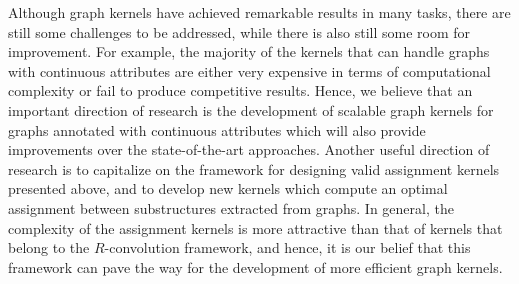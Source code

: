 \documentclass[twoside,11pt]{article}
\begin{document}
Although graph kernels have achieved remarkable results in many tasks, there are still some challenges to be addressed, while there is also still some room for improvement.
For example, the majority of the kernels that can handle graphs with continuous attributes are either very expensive in terms of computational complexity or fail to produce competitive results.
Hence, we believe that an important direction of research is the development of scalable graph kernels for graphs annotated with continuous attributes which will also provide improvements over the state-of-the-art approaches.
Another useful direction of research is to capitalize on the framework for designing valid assignment kernels presented above, and to develop new kernels which compute an optimal assignment between substructures extracted from graphs.
In general, the complexity of the assignment kernels is more attractive than that of kernels that belong to the $R$-convolution framework, and hence, it is our belief that this framework can pave the way for the development of more efficient graph kernels.

\vskip 0.2in


\end{document}
